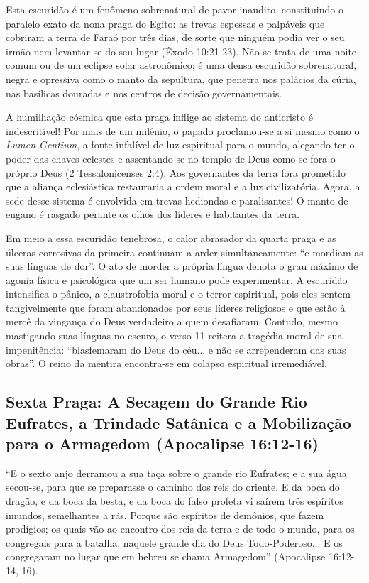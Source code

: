 \documentclass[11pt,a4paper,openany]{book}
\begin{document}
Esta escuridão é um fenômeno sobrenatural de pavor inaudito, constituindo o paralelo exato da nona praga do Egito: as trevas espessas e palpáveis que cobriram a terra de Faraó por três dias, de sorte que ninguém podia ver o seu irmão nem levantar-se do seu lugar (Êxodo 10:21-23). Não se trata de uma noite comum ou de um eclipse solar astronômico; é uma densa escuridão sobrenatural, negra e opressiva como o manto da sepultura, que penetra nos palácios da cúria, nas basílicas douradas e nos centros de decisão governamentais.

A humilhação cósmica que esta praga inflige ao sistema do anticristo é indescritível! Por mais de um milênio, o papado proclamou-se a si mesmo como o \textit{Lumen Gentium}, a fonte infalível de luz espiritual para o mundo, alegando ter o poder das chaves celestes e assentando-se no templo de Deus como se fora o próprio Deus (2 Tessalonicenses 2:4). Aos governantes da terra fora prometido que a aliança eclesiástica restauraria a ordem moral e a luz civilizatória. Agora, a sede desse sistema é envolvida em trevas hediondas e paralisantes! O manto de engano é rasgado perante os olhos dos líderes e habitantes da terra.

Em meio a essa escuridão tenebrosa, o calor abrasador da quarta praga e as úlceras corrosivas da primeira continuam a arder simultaneamente: ``e mordiam as suas línguas de dor''. O ato de morder a própria língua denota o grau máximo de agonia física e psicológica que um ser humano pode experimentar. A escuridão intensifica o pânico, a claustrofobia moral e o terror espiritual, pois eles sentem tangivelmente que foram abandonados por seus líderes religiosos e que estão à mercê da vingança do Deus verdadeiro a quem desafiaram. Contudo, mesmo mastigando suas línguas no escuro, o verso 11 reitera a tragédia moral de sua impenitência: ``blasfemaram do Deus do céu... e não se arrependeram das suas obras''. O reino da mentira encontra-se em colapso espiritual irremediável.



\subsection{Sexta Praga: A Secagem do Grande Rio Eufrates, a Trindade Satânica e a Mobilização para o Armagedom (Apocalipse 16:12-16)}


``E o sexto anjo derramou a sua taça sobre o grande rio Eufrates; e a sua água secou-se, para que se preparasse o caminho dos reis do oriente. E da boca do dragão, e da boca da besta, e da boca do falso profeta vi saírem três espíritos imundos, semelhantes a rãs. Porque são espíritos de demônios, que fazem prodígios; os quais vão ao encontro dos reis da terra e de todo o mundo, para os congregais para a batalha, naquele grande dia do Deus Todo-Poderoso... E os congregaram no lugar que em hebreu se chama Armagedom'' (Apocalipse 16:12-14, 16).
\end{document}
